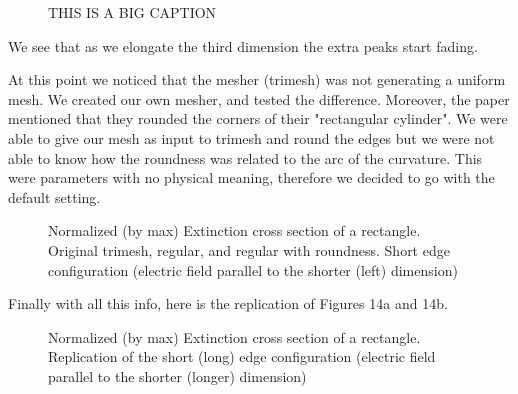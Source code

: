 \begin{figure}
    \centering
    \caption{THIS IS A BIG CAPTION}
    \label{fig:ext_y_14}   
 \end{figure}


We see that as we elongate the third dimension the extra peaks start fading. 

At this point we noticed that the mesher (trimesh) was not generating a uniform mesh. We created our 
own mesher, and tested the difference. Moreover, the paper mentioned that they rounded the corners of their
"rectangular cylinder". We were able to give our mesh as input to trimesh and round the edges but we were not able 
to know how the roundness was related to the arc of the curvature. This were parameters with no physical meaning, 
therefore we decided to go with the default setting. 


\begin{figure}
    \centering
    \caption{Normalized (by max) Extinction cross section of a rectangle. Original trimesh, regular, and regular with 
    roundness. Short edge configuration (electric field parallel to the shorter (left) dimension)}
    \label{fig:tri_reg_round_14}
 \end{figure}


 Finally with all this info, here is the replication of Figures 14a and 14b. 

 \begin{figure}
    \centering

    \caption{Normalized (by max) Extinction cross section of a rectangle. Replication of 
    the short (long) edge configuration (electric field parallel to the shorter (longer) dimension)}
    \label{fig:rep_14}
 \end{figure}


